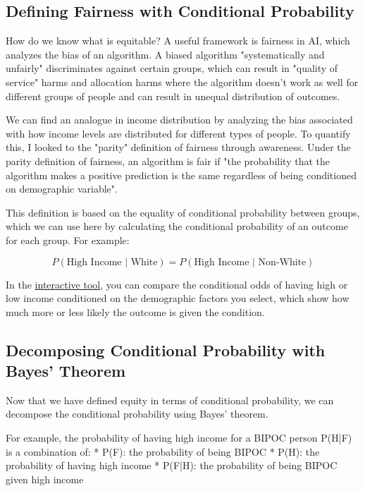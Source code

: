 \documentclass[11pt]{article}
\begin{document}
\subsection*{Defining Fairness with Conditional Probability}

How do we know what is equitable? A useful framework is fairness in AI, which analyzes the bias of an algorithm. A biased algorithm "systematically and unfairly" discriminates against certain groups, which can result in "quality of service" harms and allocation harms where the algorithm doesn't work as well for different groups of people and can result in unequal distribution of outcomes.\cite{creel}

We can find an analogue in income distribution by analyzing the bias associated with how income levels are distributed for different types of people. To quantify this, I looked to the "parity" definition of fairness through awareness. Under the parity definition of fairness, an algorithm is fair if "the probability that the algorithm makes a positive prediction is the same regardless of being conditioned on demographic variable".\cite{piech:fair}

This definition is based on the equality of conditional probability between groups, which we can use here by calculating the conditional probability of an outcome for each group. For example:

$$P(\text{High Income | White}) = P(\text{High Income | Non-White})$$

In the \href{https://observablehq.com/d/b1dfcf5fca53a8b2#cell-1189}{interactive tool}, you can compare the conditional odds of having high or low income conditioned on the demographic factors you select, which show  how much more or less likely the outcome is given the condition.\cite[p.~70]{ross}

\subsection*{Decomposing Conditional Probability with Bayes' Theorem}

Now that we have defined equity in terms of conditional probability, we can decompose the conditional probability using Bayes' theorem.\cite{piech:bayes} 

For example, the probability of having high income for a BIPOC person P(H|F) is a combination of: 
* P(F): the probability of being BIPOC
* P(H): the probability of having high income
* P(F|H): the probability of being BIPOC given high income
\end{document}
